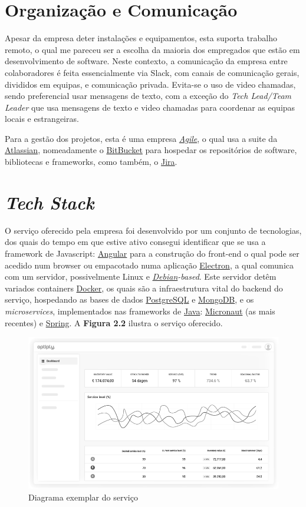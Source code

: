 \newpage

\section{Organização e Comunicação}

Apesar da empresa deter instalações e equipamentos, esta suporta trabalho remoto, o qual me pareceu ser a escolha da maioria dos empregados que estão em desenvolvimento de software. Neste contexto, a comunicação da empresa entre colaboradores é feita essencialmente via Slack, com canais de comunicação gerais, divididos em equipas, e comunicação privada. Evita-se o uso de video chamadas, sendo preferencial usar mensagens de texto, com a exceção do \textit{Tech Lead/Team Leader} que usa mensagens de texto e video chamadas para coordenar as equipas locais e estrangeiras.

Para a gestão dos projetos, esta é uma empresa \href{https://www.atlassian.com/agile}{\textit{Agile}}, o qual usa a suite da \href{https://www.atlassian.com/}{Atlassian}, nomeadamente o \href{https://bitbucket.org/}{BitBucket} para hospedar os repositórios de software, bibliotecas e frameworks, como também, o \href{https://jira.atlassian.com/}{Jira}.

\section{\textit{Tech Stack}}

O serviço oferecido pela empresa foi desenvolvido por um conjunto de tecnologias, dos quais do tempo em que estive ativo consegui identificar que se usa a framework de Javascript: \href{https://angular.io/}{Angular} para a construção do front-end o qual pode ser acedido num browser ou empacotado numa aplicação \href{https://www.electronjs.org/}{Electron}, a qual comunica com um servidor, possivelmente Linux e \textit{\href{https://www.debian.org/}{Debian}-based}. Este servidor detêm variados containers \href{https://www.docker.com/}{Docker}, os quais são a infraestrutura vital do backend do serviço, hospedando as bases de dados \href{https://www.postgresql.org/}{PostgreSQL} e \href{https://www.mongodb.com/}{MongoDB}, e os \textit{microservices}, implementados nas frameworks de \href{https://jdk.java.net/}{Java}: \href{https://micronaut.io/}{Micronaut} (as mais recentes) e \href{https://spring.io/}{Spring}. A \textbf{Figura 2.2} ilustra o serviço oferecido.

\begin{figure}[!hbt]
  \centering
  \includegraphics[width=12cm]{figuras/lol.png}
  \caption{Diagrama exemplar do serviço}
  \label{fig:diag_eg}
\end{figure}
\FloatBarrier
